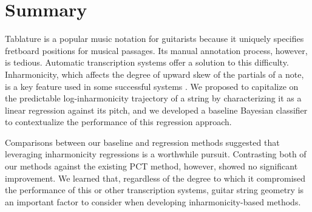 \documentclass[convention,peer-reviewed]{aesconf}
\begin{document}
\section{Summary} 
Tablature is a popular music notation for guitarists because it uniquely specifies fretboard positions for musical passages. Its manual annotation process, however, is tedious. Automatic transcription systems offer a solution to this difficulty. Inharmonicity, which affects the degree of upward skew of the partials of a note, is a key feature used in some successful systems \citep{barbanchoi2012}. We proposed to capitalize on the predictable log-inharmonicity trajectory of a string by characterizing it as a linear regression against its pitch, and we developed a baseline Bayesian classifier to contextualize the performance of this regression approach. 

Comparisons between our baseline and regression methods suggested that leveraging inharmonicity regressions is a worthwhile pursuit. Contrasting both of our methods against the existing PCT method, however, showed no significant improvement. We learned that, regardless of the degree to which it compromised the performance of this or other transcription systems, guitar string geometry is an important factor to consider when developing inharmonicity-based methods.




\end{document}
